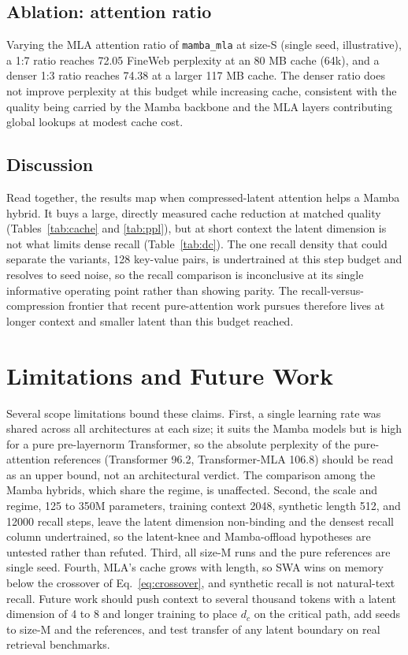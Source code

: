 \documentclass[conference]{IEEEtran}
\begin{document}
\subsection{Ablation: attention ratio}
Varying the MLA attention ratio of \texttt{mamba\_mla} at size-S (single seed, illustrative), a 1:7 ratio reaches 72.05 FineWeb perplexity at an 80 MB cache (64k), and a denser 1:3 ratio reaches 74.38 at a larger 117 MB cache. The denser ratio does not improve perplexity at this budget while increasing cache, consistent with the quality being carried by the Mamba backbone and the MLA layers contributing global lookups at modest cache cost.

\subsection{Discussion}
Read together, the results map when compressed-latent attention helps a Mamba hybrid. It buys a large, directly measured cache reduction at matched quality (Tables~\ref{tab:cache} and \ref{tab:ppl}), but at short context the latent dimension is not what limits dense recall (Table~\ref{tab:dc}). The one recall density that could separate the variants, 128 key-value pairs, is undertrained at this step budget and resolves to seed noise, so the recall comparison is inconclusive at its single informative operating point rather than showing parity. The recall-versus-compression frontier that recent pure-attention work pursues \cite{cat} therefore lives at longer context and smaller latent than this budget reached.

\section{Limitations and Future Work}
\label{sec:limits}
Several scope limitations bound these claims. First, a single learning rate was shared across all architectures at each size; it suits the Mamba models but is high for a pure pre-layernorm Transformer, so the absolute perplexity of the pure-attention references (Transformer 96.2, Transformer-MLA 106.8) should be read as an upper bound, not an architectural verdict. The comparison among the Mamba hybrids, which share the regime, is unaffected. Second, the scale and regime, 125 to 350M parameters, training context 2048, synthetic length 512, and 12000 recall steps, leave the latent dimension non-binding and the densest recall column undertrained, so the latent-knee and Mamba-offload hypotheses are untested rather than refuted. Third, all size-M runs and the pure references are single seed. Fourth, MLA's cache grows with length, so SWA wins on memory below the crossover of Eq.~\ref{eq:crossover}, and synthetic recall is not natural-text recall. Future work should push context to several thousand tokens with a latent dimension of 4 to 8 and longer training to place $d_c$ on the critical path, add seeds to size-M and the references, and test transfer of any latent boundary on real retrieval benchmarks.
\end{document}
